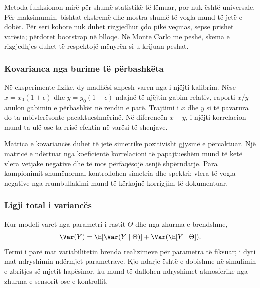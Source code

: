 Metoda funksionon mirë për shumë statistikë të lëmuar, por nuk është universale. Për maksimumin, bishtat ekstremë dhe mostra shumë të vogla mund të jetë e dobët. Për seri kohore nuk duhet rizgjedhur çdo pikë veçmas, sepse prishet varësia; përdoret bootstrap në blloqe. Në Monte Carlo me peshë, skema e rizgjedhjes duhet të respektojë mënyrën si u krijuan peshat.

\subsubsection{Kovarianca nga burime të përbashkëta}
Në eksperimente fizike, dy madhësi shpesh varen nga i njëjti kalibrim. Nëse $x=x_0(1+\epsilon)$ dhe $y=y_0(1+\epsilon)$ ndajnë të njëjtin gabim relativ, raporti $x/y$ anulon gabimin e përbashkët në rendin e parë. Trajtimi i $x$ dhe $y$ si të pavarura do ta mbivlerësonte pacaktueshmërinë. Në diferencën $x-y$, i njëjti korrelacion mund ta ulë ose ta rrisë efektin në varësi të shenjave.

Matrica e kovariancës duhet të jetë simetrike pozitivisht gjysmë e përcaktuar. Një matricë e ndërtuar nga koeficientë korrelacioni të papajtueshëm mund të ketë vlera vetjake negative dhe të mos përfaqësojë asnjë shpërndarje. Para kampionimit shumënormal kontrollohen simetria dhe spektri; vlera të vogla negative nga rrumbullakimi mund të kërkojnë korrigjim të dokumentuar.

\subsubsection{Ligji total i variancës}
Kur modeli varet nga parametri i rastit $\Theta$ dhe nga zhurma e brendshme,
\begin{equation}
 \Var(Y)=\E[\Var(Y\mid\Theta)]
 +\Var(\E[Y\mid\Theta]).
\end{equation}
Termi i parë mat variabilitetin brenda realizimeve për parametra të fiksuar; i dyti mat ndryshimin ndërmjet parametrave. Kjo ndarje është e dobishme në simulimin e zbritjes së mjetit hapësinor, ku mund të dallohen ndryshimet atmosferike nga zhurma e sensorit ose e kontrollit.

